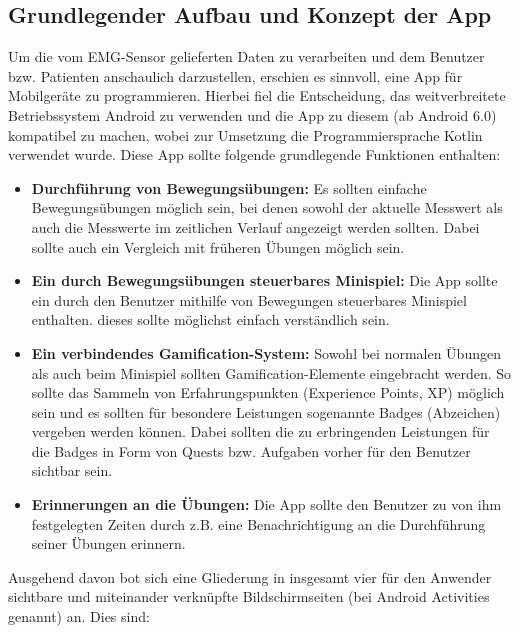 \subsection{Grundlegender Aufbau und Konzept der App}
Um die vom EMG-Sensor gelieferten Daten zu verarbeiten und dem Benutzer bzw. Patienten anschaulich darzustellen, erschien es sinnvoll, eine App für Mobilgeräte zu programmieren. Hierbei fiel die Entscheidung, das weitverbreitete Betriebssystem Android zu verwenden und die App zu diesem (ab Android 6.0) kompatibel zu machen, wobei zur Umsetzung die Programmiersprache Kotlin\cite{Src:Kotlin} verwendet wurde. Diese App sollte folgende grundlegende Funktionen enthalten:
\begin{itemize}
	\item \textbf{Durchführung von Bewegungsübungen:} Es sollten einfache Bewegungsübungen möglich sein, bei denen sowohl der aktuelle Messwert als auch die Messwerte im zeitlichen Verlauf angezeigt werden sollten. Dabei sollte auch ein Vergleich mit früheren Übungen möglich sein.
	\item \textbf{Ein durch Bewegungsübungen steuerbares Minispiel:} Die App sollte ein durch den Benutzer mithilfe von Bewegungen steuerbares Minispiel enthalten. dieses sollte möglichst einfach verständlich sein.
	\item \textbf{Ein verbindendes Gamification-System:} Sowohl bei normalen Übungen als auch beim Minispiel sollten Gamification-Elemente eingebracht werden. So sollte das Sammeln von Erfahrungspunkten (Experience Points, XP) möglich sein und es sollten für besondere Leistungen sogenannte Badges (Abzeichen) vergeben werden können. Dabei sollten die zu erbringenden Leistungen für die Badges in Form von Quests bzw. Aufgaben vorher für den Benutzer sichtbar sein.
	\item \textbf{Erinnerungen an die Übungen:} Die App sollte den Benutzer zu von ihm festgelegten Zeiten durch z.B. eine Benachrichtigung an die Durchführung seiner Übungen erinnern.
\end{itemize}
Ausgehend davon bot sich eine Gliederung in insgesamt vier für den Anwender sichtbare und miteinander verknüpfte Bildschirmseiten (bei Android Activities\cite{Src:AndroidKuenneth} genannt) an. Dies sind:
